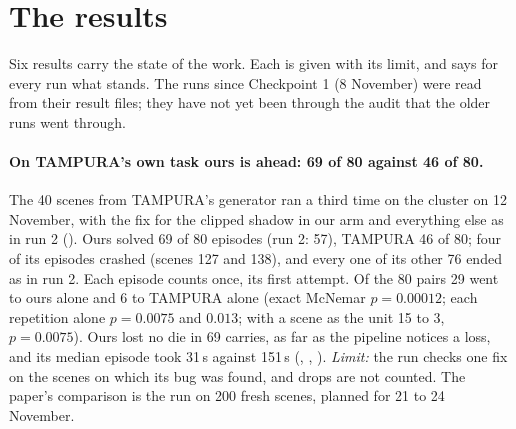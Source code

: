 \section{The results}
\label{sec:results}

Six results carry the state of the work. Each is given with its limit, and  says for every run
what stands. The runs since Checkpoint 1 (8 November) were read from their result files; they have not yet been
through the audit that the older runs went through.

\paragraph{On TAMPURA's own task ours is ahead: 69 of 80 against 46 of 80.}
The 40 scenes from TAMPURA's generator ran a third time on the cluster on 12 November, with the fix for the
clipped shadow in our arm and everything else as in run 2 (). Ours solved 69 of 80 episodes (run 2: 57),
TAMPURA 46 of 80; four of its episodes crashed (scenes 127 and 138), and every one of its other 76 ended as in run
2. Each episode counts once, its first attempt. Of the 80 pairs 29 went to ours alone and 6 to TAMPURA alone (exact
McNemar $p = 0.00012$; each repetition alone $p = 0.0075$ and $0.013$; with a scene as the unit 15 to 3,
$p = 0.0075$). Ours lost no die in 69 carries, as far as the pipeline notices a loss, and its median episode took
31\,s against 151\,s (, , ).
\emph{Limit:} the run checks one fix on the scenes on which its bug was found, and drops are not counted. The
paper's comparison is the run on 200 fresh scenes, planned for 21 to 24 November.

